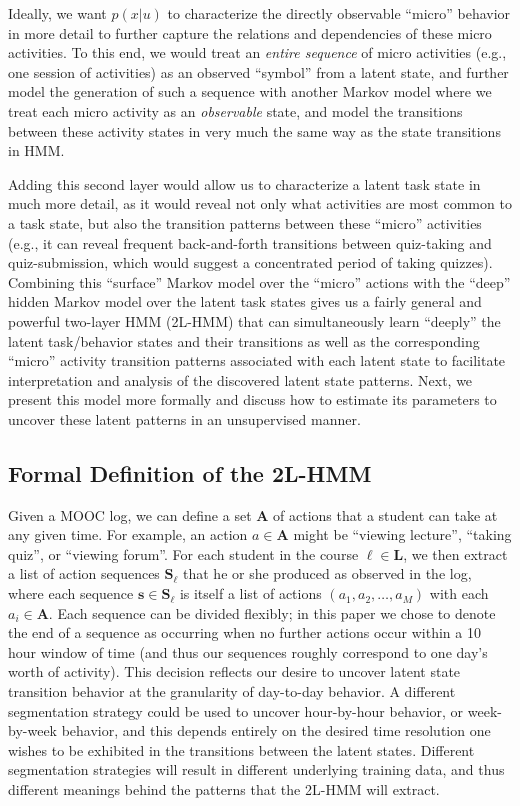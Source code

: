 Ideally, we want $p(x|u)$ to characterize the directly observable ``micro''
behavior in more detail to further capture the relations and dependencies
of these micro activities. To this end, we would treat an {\em entire
sequence} of micro activities (e.g., one session of activities) as an
observed ``symbol'' from a latent state, and further model the generation
of such a sequence with another Markov model where we treat each micro
activity as an {\em observable} state, and model the transitions between
these activity states in very much the same way as the state transitions in
HMM.

Adding this second layer would allow us to characterize a latent task
state in much more detail, as it would reveal not only what activities are
most common to a task state, but also the transition patterns between these
``micro'' activities (e.g., it can reveal frequent back-and-forth
transitions between quiz-taking and quiz-submission, which would suggest a
concentrated period of taking quizzes). Combining this ``surface'' Markov
model over the ``micro'' actions with the ``deep'' hidden Markov model over
the latent task states gives us a fairly general and powerful two-layer HMM
(2L-HMM) that can simultaneously learn ``deeply'' the latent task/behavior
states and their transitions as well as the corresponding ``micro''
activity transition patterns associated with each latent state to
facilitate interpretation and analysis of the discovered latent state
patterns. Next, we present this model more formally and discuss how to
estimate its parameters to uncover these latent patterns in an unsupervised
manner.

\subsection{Formal Definition of the 2L-HMM}

Given a MOOC log, we can define a set $\mathbf{A}$ of actions that a
student can take at any given time. For example, an action $a \in
\mathbf{A}$ might be ``viewing lecture'', ``taking quiz'', or ``viewing
forum''. For each student in the course $\ell \in \mathbf{L}$, we then
extract a list of action sequences $\mathbf{S}_\ell$ that he or she
produced as observed in the log, where each sequence $\mathbf{s} \in
\mathbf{S}_\ell$ is itself a list of actions $(a_1, a_2, \ldots, a_M)$ with
each $a_i \in \mathbf{A}$.  Each sequence can be divided flexibly; in this
paper we chose to denote the end of a sequence as occurring when no further
actions occur within a 10 hour window of time (and thus our sequences
roughly correspond to one day's worth of activity). This decision reflects
our desire to uncover latent state transition behavior at the granularity
of day-to-day behavior. A different segmentation strategy could be used to
uncover hour-by-hour behavior, or week-by-week behavior, and this depends
entirely on the desired time resolution one wishes to be exhibited in the
transitions between the latent states. Different segmentation strategies
will result in different underlying training data, and thus different
meanings behind the patterns that the 2L-HMM will extract.

